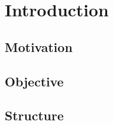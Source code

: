 \chapter{Introduction}
\label{cha:introduction}

\section{Motivation}

\section{Objective}

\section{Structure}
